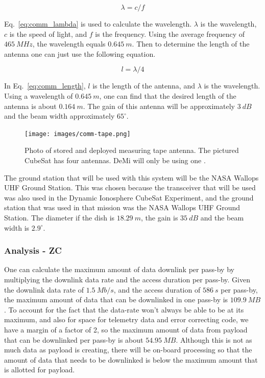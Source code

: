 \documentclass[12pt]{article}
\begin{document}
\begin{equation}\label{eq:comm_lambda}
\lambda = c/f
\end{equation}

Eq.~\ref{eq:comm_lambda} is used to calculate the wavelength. $\lambda$ is the wavelength, $c$ is the speed of light, and $f$ is the frequency. Using the average frequency of $465\ MHz$, the wavelength equals $0.645\ m$. Then to determine the length of the antenna one can just use the following equation.

\begin{equation}\label{eq:comm_length}
l = \lambda/4
\end{equation}

In Eq.~\ref{eq:comm_length}, $l$ is the length of the antenna, and $\lambda$ is the wavelength. Using a wavelength of $0.645\ m$, one can find that the desired length of the antenna is about $0.164\ m$. The gain of this antenna will be approximately $3\ dB$ and the beam width approximately $65^\circ$.

\begin{figure}[ht]
\centering
  \texttt{[image: images/comm-tape.png]}
\caption{Photo of stored and deployed measuring tape antenna. The pictured CubeSat has four antennas. DeMi will only be using one \cite{antenna}.}
\label{fig:comm_tape}
\end{figure}

The ground station that will be used with this system will be the NASA Wallops UHF Ground Station. This was chosen because the transceiver that will be used was also used in the Dynamic Ionosphere CubeSat Experiment, and the ground station that was used in that mission was the NASA Wallops UHF Ground Station. The diameter if the dish is $18.29\ m$, the gain is $35\ dB$ and the beam width is $2.9^\circ$.

			\subsubsection{Analysis - ZC}

One can calculate the maximum amount of data downlink per pass-by by multiplying the downlink data rate and the access duration per pass-by. Given the downlink data rate of $1.5\ Mb/s$, and the access duration of $586\ s$ per pass-by, the maximum amount of data that can be downlinked in one pass-by is $109.9\ MB$. To account for the fact that the data-rate won’t always be able to be at its maximum, and also for space for telemetry data and error correcting code, we have a margin of a factor of 2, so the maximum amount of data from payload that can be downlinked per pass-by is about $54.95\ MB$. Although this is not as much data as payload is creating, there will be on-board processing so that the amount of data that needs to be downlinked is below the maximum amount that is allotted for payload.
\end{document}
